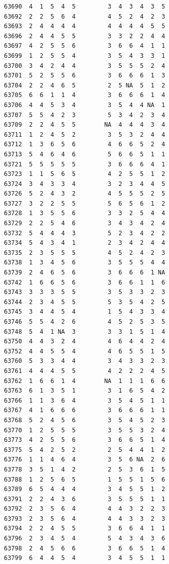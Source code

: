 \documentclass[
  letterpaper,
  DIV=11,
  numbers=noendperiod]{scrreprt}
\begin{document}
\begin{verbatim}
63690  4  1  5  4  5         3  4  3  4  3  5
63692  2  2  5  6  4         4  5  2  4  2  3
63693  2  4  4  4  4         4  4  4  4  5  5
63696  2  4  4  5  5         3  3  2  2  4  4
63697  4  2  5  5  6         3  6  6  4  1  1
63699  1  2  5  5  4         3  5  4  3  3  1
63700  3  4  2  4  4         3  5  5  5  2  4
63701  5  2  5  5  6         3  6  6  6  1  3
63704  2  2  4  6  5         2  5 NA  5  1  2
63705  6  6  1  1  4         3  6  6  6  1  4
63706  4  4  5  3  4         3  5  4  4 NA  1
63707  5  5  4  2  3         5  3  4  2  3  4
63709  2  2  4  5  5        NA  4  4  4  3  4
63711  1  2  4  5  2         3  5  3  2  4  4
63712  1  3  6  5  6         4  6  6  5  2  4
63713  5  4  6  4  6         5  6  6  5  1  1
63721  5  5  5  5  5         3  6  6  6  4  1
63723  1  1  5  6  5         4  2  5  5  1  2
63724  3  4  3  3  4         3  2  3  4  4  5
63726  5  2  4  3  2         4  5  5  5  2  5
63727  3  2  2  5  5         5  6  5  6  1  2
63728  1  3  5  5  6         3  3  2  5  4  4
63729  2  2  5  4  6         3  4  3  4  2  4
63732  5  4  4  4  3         5  2  3  4  2  2
63734  5  4  3  4  1         2  3  4  2  4  4
63735  2  3  5  5  5         4  5  2  4  2  3
63738  1  3  4  5  6         3  5  5  5  4  4
63739  2  4  6  5  6         3  6  6  6  1 NA
63742  1  6  6  5  6         3  6  6  1  1  6
63743  3  3  3  5  5         3  5  3  3  2  3
63744  2  3  4  5  5         5  3  5  4  2  5
63745  3  4  4  5  4         1  5  4  3  3  4
63746  5  5  4  2  6         4  5  2  5  3  5
63748  5  4  1 NA  3         3  3  1  5  1  4
63750  4  4  3  2  4         4  6  4  4  2  4
63752  4  4  5  5  4         4  6  5  5  1  5
63760  5  3  3  4  4         3  4  3  3  2  3
63761  4  4  4  5  5         4  2  2  2  4  5
63762  1  6  6  1  4        NA  1  1  1  6  6
63763  6  1  3  5  1         3  1  6  5  4  2
63766  1  1  3  6  4         3  5  4  5  1  1
63767  4  1  6  6  6         3  6  6  6  1  1
63768  5  2  4  5  6         3  5  4  5  2  3
63770  1  2  5  5  5         3  5  5  3  2  4
63773  4  2  5  5  6         3  6  6  5  1  4
63775  5  4  2  5  2         2  5  4  4  1  2
63776  1  1  4  6  4         3  5  6 NA  2  6
63778  3  5  1  4  2         2  5  3  6  1  5
63788  1  2  5  6  5         1  5  5  1  5  6
63789  6  5  4  4  4         3  4  5  5  1  2
63791  2  2  4  3  6         3  5  5  5  1  1
63792  2  3  5  6  4         4  4  3  2  2  3
63793  2  3  5  6  4         4  4  3  3  2  3
63794  2  2  4  5  5         3  6  6  4  1  1
63796  2  3  4  5  4         5  4  3  4  3  6
63798  2  4  5  6  6         3  6  6  5  1  4
63799  6  4  4  5  4         3  4  5  5  1  1

\end{verbatim}
\end{document}
